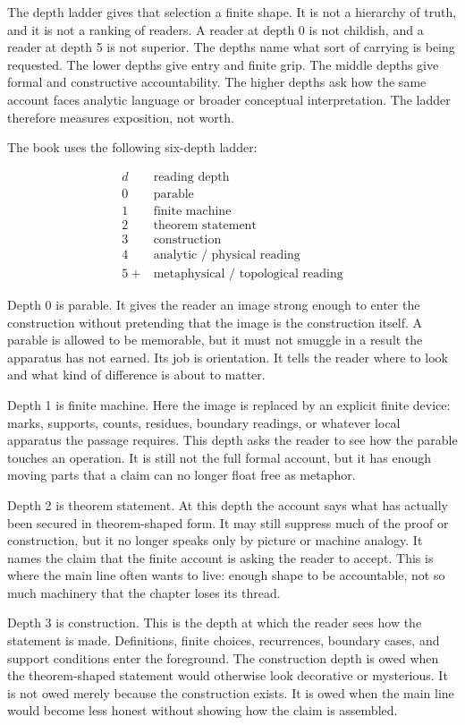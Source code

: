 The depth ladder gives that selection a finite shape. It is not a hierarchy of
truth, and it is not a ranking of readers. A reader at depth 0 is not childish,
and a reader at depth 5 is not superior. The depths name what sort of carrying
is being requested. The lower depths give entry and finite grip. The middle
depths give formal and constructive accountability. The higher depths ask how
the same account faces analytic language or broader conceptual interpretation.
The ladder therefore measures exposition, not worth.

The book uses the following six-depth ladder:

\[
\begin{array}{c|l}
d & \text{reading depth} \\
\hline
0 & \text{parable} \\
1 & \text{finite machine} \\
2 & \text{theorem statement} \\
3 & \text{construction} \\
4 & \text{analytic / physical reading} \\
5+ & \text{metaphysical / topological reading}
\end{array}
\]

Depth 0 is parable. It gives the reader an image strong enough to enter the
construction without pretending that the image is the construction itself. A
parable is allowed to be memorable, but it must not smuggle in a result the
apparatus has not earned. Its job is orientation. It tells the reader where to
look and what kind of difference is about to matter.

Depth 1 is finite machine. Here the image is replaced by an explicit finite
device: marks, supports, counts, residues, boundary readings, or whatever local
apparatus the passage requires. This depth asks the reader to see how the
parable touches an operation. It is still not the full formal account, but it
has enough moving parts that a claim can no longer float free as metaphor.

Depth 2 is theorem statement. At this depth the account says what has actually
been secured in theorem-shaped form. It may still suppress much of the proof or
construction, but it no longer speaks only by picture or machine analogy. It
names the claim that the finite account is asking the reader to accept. This is
where the main line often wants to live: enough shape to be accountable, not so
much machinery that the chapter loses its thread.

Depth 3 is construction. This is the depth at which the reader sees how the
statement is made. Definitions, finite choices, recurrences, boundary cases,
and support conditions enter the foreground. The construction depth is owed
when the theorem-shaped statement would otherwise look decorative or mysterious.
It is not owed merely because the construction exists. It is owed when the main
line would become less honest without showing how the claim is assembled.

